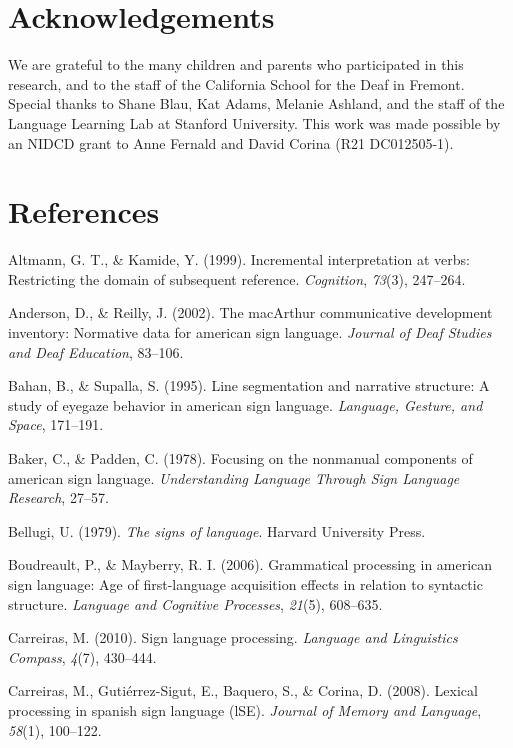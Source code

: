 \documentclass[12pt,]{article}
\begin{document}
\section{Acknowledgements}\label{acknowledgements}

We are grateful to the many children and parents who participated in
this research, and to the staff of the California School for the Deaf in
Fremont. Special thanks to Shane Blau, Kat Adams, Melanie Ashland, and
the staff of the Language Learning Lab at Stanford University. This work
was made possible by an NIDCD grant to Anne Fernald and David Corina
(R21 DC012505-1).

\newpage 

\section*{References}\label{references}

Altmann, G. T., \& Kamide, Y. (1999). Incremental interpretation at
verbs: Restricting the domain of subsequent reference. \emph{Cognition},
\emph{73}(3), 247--264.

Anderson, D., \& Reilly, J. (2002). The macArthur communicative
development inventory: Normative data for american sign language.
\emph{Journal of Deaf Studies and Deaf Education}, 83--106.

Bahan, B., \& Supalla, S. (1995). Line segmentation and narrative
structure: A study of eyegaze behavior in american sign language.
\emph{Language, Gesture, and Space}, 171--191.

Baker, C., \& Padden, C. (1978). Focusing on the nonmanual components of
american sign language. \emph{Understanding Language Through Sign
Language Research}, 27--57.

Bellugi, U. (1979). \emph{The signs of language}. Harvard University
Press.

Boudreault, P., \& Mayberry, R. I. (2006). Grammatical processing in
american sign language: Age of first-language acquisition effects in
relation to syntactic structure. \emph{Language and Cognitive
Processes}, \emph{21}(5), 608--635.

Carreiras, M. (2010). Sign language processing. \emph{Language and
Linguistics Compass}, \emph{4}(7), 430--444.

Carreiras, M., Guti{é}rrez-Sigut, E., Baquero, S., \& Corina, D. (2008).
Lexical processing in spanish sign language (lSE). \emph{Journal of
Memory and Language}, \emph{58}(1), 100--122.
\end{document}
